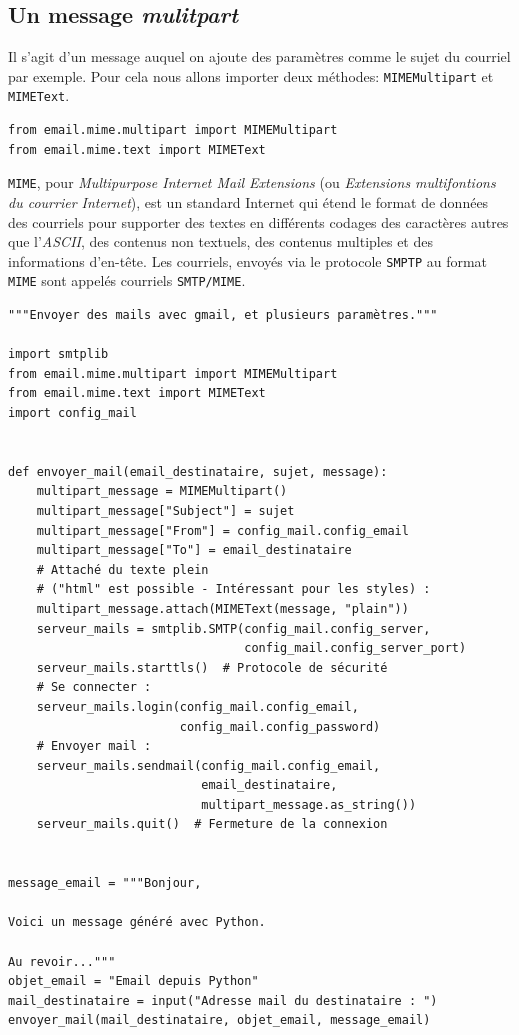 \documentclass[a4paper,11pt]{book}
\begin{document}
\subsection*{Un message \textit{mulitpart}}
Il s'agit d'un message auquel on ajoute des paramètres comme le sujet du courriel par exemple. Pour cela nous allons importer deux méthodes: \texttt{MIMEMultipart} et \texttt{MIMEText}.
\begin{lstlisting}[caption=Importer \texttt{MIMEMultipart} et \texttt{MIMEText}]
from email.mime.multipart import MIMEMultipart
from email.mime.text import MIMEText
\end{lstlisting}
\medskip

\texttt{MIME}, pour \og \textit{Multipurpose Internet Mail Extensions}\fg{} (ou \textit{Extensions multifontions du courrier Internet}), est un standard Internet qui étend le format de données des courriels pour supporter des textes en différents codages des caractères autres que l'\textit{ASCII}, des contenus non textuels, des contenus multiples et des informations d'en-tête. Les courriels, envoyés via le protocole \texttt{SMPTP} au format \texttt{MIME} sont appelés courriels \texttt{SMTP/MIME}.
\begin{lstlisting}[caption=Un courriel avec divers paramètres (\textit{multipart})]
"""Envoyer des mails avec gmail, et plusieurs paramètres."""

import smtplib
from email.mime.multipart import MIMEMultipart
from email.mime.text import MIMEText
import config_mail


def envoyer_mail(email_destinataire, sujet, message):
    multipart_message = MIMEMultipart()
    multipart_message["Subject"] = sujet
    multipart_message["From"] = config_mail.config_email
    multipart_message["To"] = email_destinataire
    # Attaché du texte plein
    # ("html" est possible - Intéressant pour les styles) :
    multipart_message.attach(MIMEText(message, "plain"))
    serveur_mails = smtplib.SMTP(config_mail.config_server,
                                 config_mail.config_server_port)
    serveur_mails.starttls()  # Protocole de sécurité
    # Se connecter :
    serveur_mails.login(config_mail.config_email, 
                        config_mail.config_password)
    # Envoyer mail :
    serveur_mails.sendmail(config_mail.config_email, 
                           email_destinataire,
                           multipart_message.as_string())
    serveur_mails.quit()  # Fermeture de la connexion


message_email = """Bonjour,

Voici un message généré avec Python.

Au revoir..."""
objet_email = "Email depuis Python"
mail_destinataire = input("Adresse mail du destinataire : ")
envoyer_mail(mail_destinataire, objet_email, message_email)
\end{lstlisting}
\medskip
\end{document}
